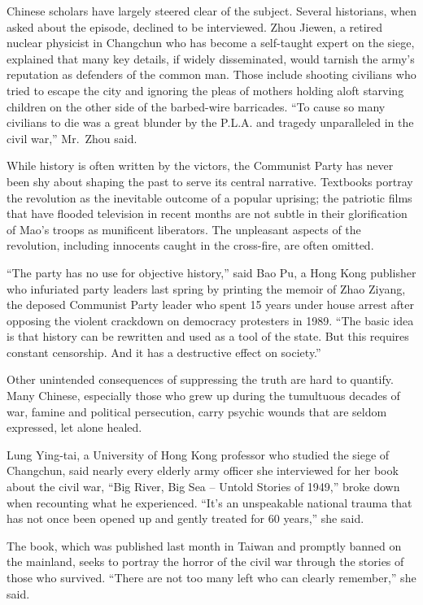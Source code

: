 ﻿\documentclass[12pt]{article}
\begin{document}
Chinese scholars have largely steered clear of the subject. Several historians, when asked about the
episode, declined to be interviewed. Zhou Jiewen, a retired nuclear physicist in Changchun who has
become a self-taught expert on the siege, explained that many key details, if widely disseminated,
would tarnish the army's reputation as defenders of the common man. Those include shooting civilians
who tried to escape the city and ignoring the pleas of mothers holding aloft starving children on
the other side of the barbed-wire barricades. ``To cause so many civilians to die was a great
blunder by the P.L.A. and tragedy unparalleled in the civil war,'' Mr.~Zhou said.

While history is often written by the victors, the Communist Party has never been shy about shaping
the past to serve its central narrative. Textbooks portray the revolution as the inevitable outcome
of a popular uprising; the patriotic films that have flooded television in recent months are not
subtle in their glorification of Mao's troops as munificent liberators. The unpleasant aspects of
the revolution, including innocents caught in the cross-fire, are often omitted.

``The party has no use for objective history,'' said Bao Pu, a Hong Kong publisher who infuriated
party leaders last spring by printing the memoir of Zhao Ziyang, the deposed Communist Party leader
who spent 15 years under house arrest after opposing the violent crackdown on democracy protesters
in 1989. ``The basic idea is that history can be rewritten and used as a tool of the state. But this
requires constant censorship. And it has a destructive effect on society.''

Other unintended consequences of suppressing the truth are hard to quantify. Many Chinese,
especially those who grew up during the tumultuous decades of war, famine and political persecution,
carry psychic wounds that are seldom expressed, let alone healed.

Lung Ying-tai, a University of Hong Kong professor who studied the siege of Changchun, said nearly
every elderly army officer she interviewed for her book about the civil war, ``Big River, Big Sea --
Untold Stories of 1949,'' broke down when recounting what he experienced. ``It's an unspeakable
national trauma that has not once been opened up and gently treated for 60 years,'' she said.

The book, which was published last month in Taiwan and promptly banned on the mainland, seeks to
portray the horror of the civil war through the stories of those who survived. ``There are not too
many left who can clearly remember,'' she said.
\end{document}
